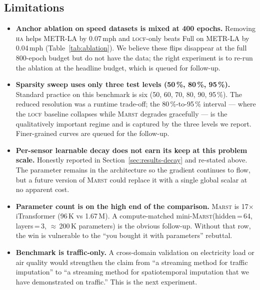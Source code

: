 \documentclass[11pt]{article}
\newcommand{\MARST}{\textsc{Marst}\xspace}
\newcommand{\LOCF}{\textsc{locf}\xspace}
\newcommand{\HA}{\textsc{ha}\xspace}
\begin{document}
\subsection*{Limitations}
\label{sec:limitations}

\begin{itemize}
\item[\textbf{L1}] \textbf{Anchor ablation on speed datasets is mixed
   at 400 epochs.}  Removing \HA helps METR-LA by 0.07\,mph and
   \LOCF-only beats Full on METR-LA by 0.04\,mph
   (Table~\ref{tab:ablation}).  We believe these flips disappear at
   the full 800-epoch budget but do not have the data; the right
   experiment is to re-run the ablation at the headline budget, which
   is queued for follow-up.

\item[\textbf{L2}] \textbf{Sparsity sweep uses only three test levels
   (50\,\%, 80\,\%, 95\,\%).}  Standard practice on this benchmark is
   six (50, 60, 70, 80, 90, 95\,\%).  The reduced resolution was a
   runtime trade-off; the 80\,\%-to-95\,\% interval --- where the
   \LOCF baseline collapses while \MARST degrades gracefully --- is
   the qualitatively important regime and is captured by the three
   levels we report.  Finer-grained curves are queued for the
   follow-up.

\item[\textbf{L3}] \textbf{Per-sensor learnable decay does not earn
   its keep at this problem scale.}  Honestly reported in
   Section~\ref{sec:results-decay} and re-stated above.  The
   parameter remains in the architecture so the gradient continues to
   flow, but a future version of \MARST could replace it with a single
   global scalar at no apparent cost.

\item[\textbf{L4}] \textbf{Parameter count is on the high end of the
   comparison.}  \MARST is 17$\times$ iTransformer (96\,K vs 1.67\,M).
   A compute-matched mini-\MARST (hidden\,=\,64, layers\,=\,3,
   $\approx$\,200\,K parameters) is the obvious follow-up.  Without
   that row, the win is vulnerable to the ``you bought it with
   parameters'' rebuttal.

\item[\textbf{L5}] \textbf{Benchmark is traffic-only.}  A cross-domain
   validation on electricity load or air quality would strengthen the
   claim from ``a streaming method for traffic imputation'' to ``a
   streaming method for spatiotemporal imputation that we have
   demonstrated on traffic.''  This is the next experiment.


\end{itemize}
\end{document}
